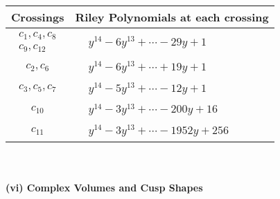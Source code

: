 \documentclass[1p]{elsarticle_modified}
\theoremstyle{definition}
\begin{document}
\begin{tabular}{m{50pt}|m{274pt}}
Crossings & \hspace{64pt}Riley Polynomials at each crossing \\
\hline $$\begin{aligned}c_{1},c_{4},c_{8}\\c_{9},c_{12}\end{aligned}$$&$\begin{aligned}
&y^{14}-6 y^{13}+\cdots-29 y+1
\end{aligned}$\\
\hline $$\begin{aligned}c_{2},c_{6}\end{aligned}$$&$\begin{aligned}
&y^{14}-6 y^{13}+\cdots+19 y+1
\end{aligned}$\\
\hline $$\begin{aligned}c_{3},c_{5},c_{7}\end{aligned}$$&$\begin{aligned}
&y^{14}-5 y^{13}+\cdots-12 y+1
\end{aligned}$\\
\hline $$\begin{aligned}c_{10}\end{aligned}$$&$\begin{aligned}
&y^{14}-3 y^{13}+\cdots-200 y+16
\end{aligned}$\\
\hline $$\begin{aligned}c_{11}\end{aligned}$$&$\begin{aligned}
&y^{14}-3 y^{13}+\cdots-1952 y+256
\end{aligned}$\\
\hline
\end{tabular}\\~\\
\newpage\flushleft \textbf{(vi) Complex Volumes and Cusp Shapes}
\end{document}
